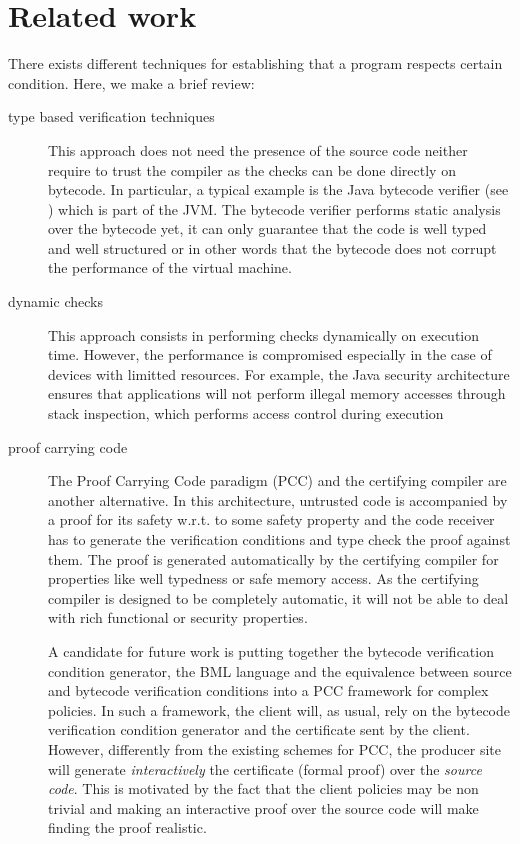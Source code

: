 \section{Related work}

There exists different techniques for establishing that a program respects certain condition. Here, we make a brief review:

\begin{description}
  
  

   \item [type based verification techniques] 
     This approach does not need the presence of the source code neither require to trust the compiler as
     the checks can be done directly on bytecode. In particular, a typical example is the Java bytecode
     verifier (see \cite{Ljbc}) which is part of the JVM. The bytecode verifier performs static analysis over the bytecode yet,
     it can only guarantee that  the code is well typed and well structured or in other words that the
     bytecode does not corrupt the performance of the virtual machine. 

   \item [dynamic checks] This approach consists in performing checks dynamically on execution time.    
     However, the performance is compromised especially in the case of 
     devices with limitted resources.  For example,
     the Java security architecture ensures that applications will not
     perform illegal memory accesses through stack inspection, which
     performs access control during execution
   
   \item[proof carrying code]
     The Proof Carrying Code paradigm (PCC) and the certifying compiler \cite{DesNecLee98} are another alternative.
     In this architecture, untrusted code
     is accompanied by a proof for its safety w.r.t. to some safety property and the code receiver has  to generate the 
     verification conditions and type check the proof against them. 
     The proof is generated automatically by the certifying compiler for properties like well typedness or safe memory access. 
     As the certifying compiler is designed to be completely automatic, it will not be able to deal with rich functional or security properties. 
     
     A candidate for future work is putting together the bytecode verification condition generator, 
     the  BML language and the equivalence between source and bytecode verification conditions into a PCC framework for complex policies.
     In such a framework, the client
     will, as usual, rely  on the bytecode verification condition generator and  the certificate sent by the client. 
     However, differently from the existing schemes for PCC, the producer site will generate \textit{interactively} the certificate (formal proof) 
     over the \textit{source code}. This is motivated by the fact that the client policies may be non trivial and making an interactive proof over the source
     code will make finding the proof realistic.

\end{description}


